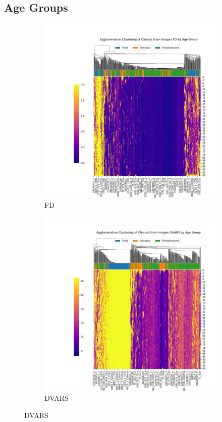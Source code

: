 \subsection{Age Groups}

\begin{figure}[t]
	\centering
	\begin{subfigure}{0.49\textwidth}
		\centering
		\includegraphics[width=1.0\textwidth]{6/figures/agegroup-bold-fd-sns-agg.png}
		\caption{FD}
	\end{subfigure}
	\begin{subfigure}{0.49\textwidth}
		\centering
		\includegraphics[width=1.0\textwidth]{6/figures/agegroup-bold-dvars-sns-agg.png}
		\caption{DVARS}
	\end{subfigure}
	

\end{figure}
